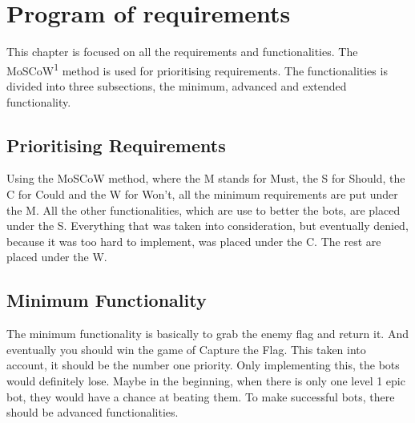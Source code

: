 \chapter{Program of requirements}
This chapter is focused on all the requirements and functionalities. The MoSCoW\textsuperscript{1} method is used for prioritising requirements. The functionalities is divided into three subsections, the minimum, advanced and extended functionality. 
\section{Prioritising Requirements}
Using the MoSCoW method, where the M stands for Must, the S for Should, the C for Could and the W for Won't, all the minimum requirements are put under the M. All the other functionalities, which are use to better the bots, are placed under the S. Everything that was taken into consideration, but eventually denied, because it was too hard to implement, was placed under the C. The rest are placed under the W.\\


\section{Minimum Functionality}
The minimum functionality is basically to grab the enemy flag and return it. And eventually you should win the game of Capture the Flag. This taken into account, it should be the number one priority. Only implementing this, the bots would definitely lose. Maybe in the beginning, when there is only one level 1 epic bot, they would have a chance at beating them. To make successful bots, there should be advanced functionalities.\\ 


